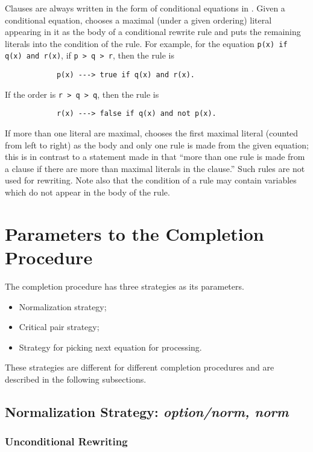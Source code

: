 Clauses are always written in the form of conditional equations in \ERRL.
Given a conditional equation, \RRL chooses a maximal (under a given
ordering) literal
appearing in it as the body of a conditional rewrite rule and 
puts the remaining literals into the condition of the rule.
For example, for the equation {\tt p(x) if q(x) and r(x)},
if {\tt p > q > r}, then the rule is 
\begin{verbatim}
            p(x) ---> true if q(x) and r(x).
\end{verbatim}
If the order is {\tt r > q > q}, then the rule is 
\begin{verbatim}
            r(x) ---> false if q(x) and not p(x).
\end{verbatim}
If more than one literal are maximal, \RRL chooses the first
maximal literal (counted from left to right) as the body and
only one rule is made from the given equation; this is in contrast
to a statement made in \cite{ZK88} that ``more than one rule is
made from a clause if there are more than maximal literals in
the clause.'' Such rules are not used for rewriting.
Note also that the condition of a rule may contain variables 
which do not appear in the body of the rule.

\section{Parameters to the Completion Procedure}

The completion procedure has three strategies as
its parameters.
\begin{itemize}
     \item Normalization strategy;
     \item Critical pair strategy;
     \item Strategy for picking next equation for processing.
\end{itemize}
These strategies are different
for different completion procedures and are described
in the following subsections.

\subsection{Normalization Strategy: {\em option/norm, norm}}

\subsubsection{Unconditional Rewriting}

